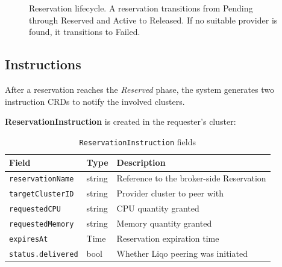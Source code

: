 \begin{figure}[htbp]
\centering
{}
\caption{Reservation lifecycle. A reservation transitions from Pending through Reserved and Active to Released. If no suitable provider is found, it transitions to Failed.}
\label{fig:reservation-lifecycle}
\end{figure}

\subsection{Instructions}
\label{subsec:instructions}

After a reservation reaches the \textit{Reserved} phase, the system generates two instruction CRDs to notify the involved clusters.

\textbf{ReservationInstruction} is created in the requester's cluster:

\begin{table}[htbp]
\centering
\caption{\texttt{ReservationInstruction} fields}
\label{tab:reservation-instruction}
\begin{tabular}{@{}llp{7cm}@{}}
\toprule
\textbf{Field} & \textbf{Type} & \textbf{Description} \\
\midrule
\texttt{reservationName} & string & Reference to the broker-side Reservation \\
\texttt{targetClusterID} & string & Provider cluster to peer with \\
\texttt{requestedCPU} & string & CPU quantity granted \\
\texttt{requestedMemory} & string & Memory quantity granted \\
\texttt{expiresAt} & Time & Reservation expiration time \\
\texttt{status.delivered} & bool & Whether Liqo peering was initiated \\
\bottomrule
\end{tabular}
\end{table}

